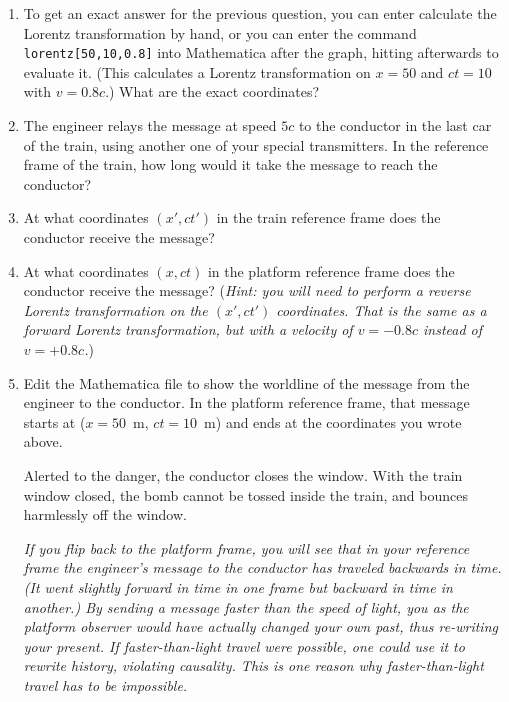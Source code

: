 \begin{enumerate}[wide]
\item To get an exact answer for the previous question, you can enter calculate the Lorentz transformation by hand, or you can enter the command \verb!lorentz[50,10,0.8]!
into Mathematica after the graph, hitting  afterwards to evaluate it.  (This calculates a Lorentz transformation on $x=50$ and $ct=10$ with $v=0.8c$.)  What are the exact coordinates?
\answerspace{0.7in}

\item The engineer relays the message at speed $5c$ to the conductor in the last car of the train, using another one of your special transmitters. In the reference frame of the train, how long would it take the message to reach the conductor?
\answerspace{0.7in}

\item At what coordinates $(x', ct')$ in the train reference frame does the conductor receive the message?
\answerspace{0.7in}

\item At what coordinates $(x, ct)$ in the platform reference frame does the conductor receive the message?  (\textit{Hint: you will need to perform a reverse Lorentz transformation on the $(x', ct')$ coordinates.  That is the same as a forward Lorentz transformation, but with a velocity of $v=-0.8c$ instead of $v=+0.8c$.})
\answerspace{0.7in}

\item Edit the Mathematica file to show the worldline of the message from the engineer to the conductor.  In the platform reference frame, that message starts at ($x=50$~m, $ct=10$~m) and ends at the coordinates you wrote above. 

\medskip

Alerted to the danger, the conductor closes the window. With the train window closed, the bomb cannot be tossed inside the train, and bounces harmlessly off the window. 
\bigskip

\textit{If you flip back to the platform frame, you will see that in your reference frame the engineer's message to the conductor has traveled backwards in time.  (It went slightly forward in time in one frame but backward in time in another.)  By sending a message faster than the speed of light, you as the platform observer would have actually changed your own past, thus re-writing your present.  If faster-than-light travel were possible, one could use it to rewrite history, violating causality.  This is one reason why faster-than-light travel has to be impossible.}

\end{enumerate}
